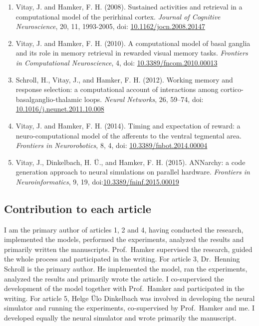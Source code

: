 \documentclass[
  11pt,
  a4paper,
]{scrbook}
\begin{document}
\begin{enumerate}
\def\labelenumi{\arabic{enumi}.}
\item
  Vitay, J. and Hamker, F. H. (2008). Sustained activities and retrieval
  in a computational model of the perirhinal cortex. \emph{Journal of
  Cognitive Neuroscience}, 20, 11, 1993-2005, doi:
  \href{http://www.mitpressjournals.org/doi/abs/10.1162/jocn.2008.20147}{10.1162/jocn.2008.20147}
\item
  Vitay, J. and Hamker, F. H. (2010). A computational model of basal
  ganglia and its role in memory retrieval in rewarded visual memory
  tasks. \emph{Frontiers in Computational Neuroscience}, 4, doi:
  \href{http://dx.doi.org/10.3389/fncom.2010.00013}{10.3389/fncom.2010.00013}
\item
  Schroll, H., Vitay, J., and Hamker, F. H. (2012). Working memory and
  response selection: a computational account of interactions among
  cortico-basalganglio-thalamic loops. \emph{Neural Networks}, 26,
  59--74, doi:
  \href{http://dx.doi.org/10.1016/j.neunet.2011.10.008}{10.1016/j.neunet.2011.10.008}
\item
  Vitay, J. and Hamker, F. H. (2014). Timing and expectation of reward:
  a neuro-computational model of the afferents to the ventral tegmental
  area. \emph{Frontiers in Neurorobotics}, 8, 4, doi:
  \href{http://dx.doi.org/10.3389/fnbot.2014.00004}{10.3389/fnbot.2014.00004}
\item
  Vitay, J., Dinkelbach, H. Ü., and Hamker, F. H. (2015). ANNarchy: a
  code generation approach to neural simulations on parallel hardware.
  \emph{Frontiers in Neuroinformatics}, 9, 19,
  doi:\href{http://dx.doi.org/10.3389/fninf.2015.00019}{10.3389/fninf.2015.00019}
\end{enumerate}

\subsection*{Contribution to each
article}\label{contribution-to-each-article}

I am the primary author of articles 1, 2 and 4, having conducted the
research, implemented the models, performed the experiments, analyzed
the results and primarily written the manuscripts. Prof.~Hamker
supervised the research, guided the whole process and participated in
the writing. For article 3, Dr.~Henning Schroll is the primary author.
He implemented the model, ran the experiments, analyzed the results and
primarily wrote the article. I co-supervised the development of the
model together with Prof.~Hamker and participated in the writing. For
article 5, Helge Ülo Dinkelbach was involved in developing the neural
simulator and running the experiments, co-supervised by Prof.~Hamker and
me. I developed equally the neural simulator and wrote primarily the
manuscript.
\end{document}
